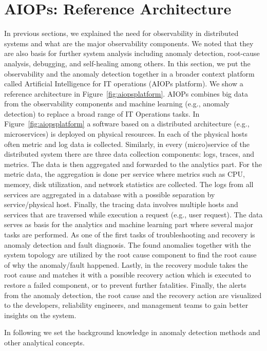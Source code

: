 \section{AIOPs: Reference Architecture}
In previous sections, we explained the need for observability in distributed systems and what are the major observability components. We noted that they are also basis for further system analysis including anomaly detection, root-cause analysis, debugging, and self-healing among others. In this section, we put the observability and the anomaly detection together in a broader context platform called Artificial Intelligence for IT operations (AIOPs platform). We show a reference architecture in Figure~\ref{fig:aiopsplatform}. AIOPs combines big data from the observability components and machine learning (e.g., anomaly detection) to replace a broad range of IT Operations tasks. In Figure~\ref{fig:aiopsplatform} a software based on a distributed architecture (e.g., microservices) is deployed on physical resources. In each of the physical hosts often metric and log data is collected. Similarly, in every (micro)service of the distributed system there are three data collection components: logs, traces, and metrics. The data is then aggregated and forwarded to the analytics part. For the metric data, the aggregation is done per service where metrics such as CPU, memory, disk utilization, and network statistics are collected. The logs from all services are aggregated in a database with a possible separation by service/physical host. Finally, the tracing data involves multiple hosts and services that are traversed while execution a request (e.g., user request). The data serves as basis for the analytics and machine learning part where several major tasks are performed. As one of the first tasks of troubleshooting and recovery is anomaly detection and fault diagnosis. The found anomalies together with the system topology are utilized by the root cause component to find the root cause of why the anomaly/fault happened. Lastly, in the recovery module takes the root cause and matches it with a possible recovery action which is executed to restore a failed component, or to prevent further fatalities. Finally, the alerts from the anomaly detection, the root cause and the recovery action are visualized to the developers, reliability engineers, and management teams to gain better insights on the system. 

In following we set the background knowledge in anomaly detection methods and other analytical concepts.


